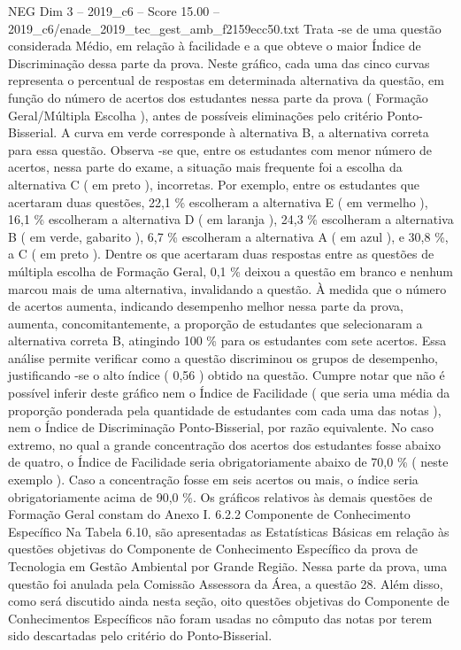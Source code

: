 \begin{textsample}{NEG Dim 3 – 2019\_c6 – Score 15.00 – 2019\_c6/enade\_2019\_tec\_gest\_amb\_f2159ecc50.txt}
Trata -se de uma questão considerada Médio, em relação à facilidade e a que obteve o maior Índice de Discriminação dessa parte da prova.
Neste gráfico, cada uma das cinco curvas representa o percentual de respostas em determinada alternativa da questão, em função do número de acertos dos estudantes nessa parte da prova ( Formação Geral/Múltipla Escolha ), antes de possíveis eliminações pelo critério Ponto-Bisserial.
A curva em verde corresponde à alternativa B, a alternativa correta para essa questão.
Observa -se que, entre os estudantes com menor número de acertos, nessa parte do exame, a situação mais frequente foi a escolha da alternativa C ( em preto ), incorretas.
Por exemplo, entre os estudantes que acertaram duas questões, 22,1 \% escolheram a alternativa E ( em vermelho ), 16,1 \% escolheram a alternativa D ( em laranja ), 24,3 \% escolheram a alternativa B ( em verde, gabarito ), 6,7 \% escolheram a alternativa A ( em azul ), e 30,8 \%, a C ( em preto ).
Dentre os que acertaram duas respostas entre as questões de múltipla escolha de Formação Geral, 0,1 \% deixou a questão em branco e nenhum marcou mais de uma alternativa, invalidando a questão.
À medida que o número de acertos aumenta, indicando desempenho melhor nessa parte da prova, aumenta, concomitantemente, a proporção de estudantes que selecionaram a alternativa correta B, atingindo 100 \% para os estudantes com sete acertos.
Essa análise permite verificar como a questão discriminou os grupos de desempenho, justificando -se o alto índice ( 0,56 ) obtido na questão.
Cumpre notar que não é possível inferir deste gráfico nem o Índice de Facilidade ( que seria uma média da proporção ponderada pela quantidade de estudantes com cada uma das notas ), nem o Índice de Discriminação Ponto-Bisserial, por razão equivalente.
No caso extremo, no qual a grande concentração dos acertos dos estudantes fosse abaixo de quatro, o Índice de Facilidade seria obrigatoriamente abaixo de 70,0 \% ( neste exemplo ).
Caso a concentração fosse em seis acertos ou mais, o índice seria obrigatoriamente acima de 90,0 \%.
Os gráficos relativos às demais questões de Formação Geral constam do Anexo I. 6.2.2 Componente de Conhecimento Específico Na Tabela 6.10, são apresentadas as Estatísticas Básicas em relação às questões objetivas do Componente de Conhecimento Específico da prova de Tecnologia em Gestão Ambiental por Grande Região.
Nessa parte da prova, uma questão foi anulada pela Comissão Assessora da Área, a questão 28.
Além disso, como será discutido ainda nesta seção, oito questões objetivas do Componente de Conhecimentos Específicos não foram usadas no cômputo das notas por terem sido descartadas pelo critério do Ponto-Bisserial.

\end{textsample}
